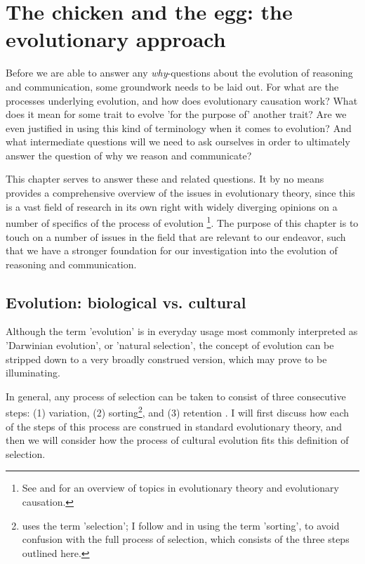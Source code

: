 \chapter{The chicken and the egg: the evolutionary approach}
\label{ch:evolution}

Before we are able to answer any \emph{why}-questions about the evolution of reasoning and communication, some groundwork needs to be laid out. For what are the processes underlying evolution, and how does evolutionary causation work? What does it mean for some trait to evolve 'for the purpose of' another trait? Are we even justified in using this kind of terminology when it comes to evolution? And what intermediate questions will we need to ask ourselves in order to ultimately answer the question of why we reason and communicate?

This chapter serves to answer these and related questions. It by no means provides a comprehensive overview of the issues in evolutionary theory, since this is a vast field of research in its own right with widely diverging opinions on a number of specifics of the process of evolution \footnote{See \citet{Ariew02} and \citet{UllerLaland19} for an overview of topics in evolutionary theory and evolutionary causation.}.
The purpose of this chapter is to touch on a number of issues in the field that are relevant to our endeavor, such that we have a stronger foundation for our investigation into the evolution of reasoning and communication.

\section{Evolution: biological vs. cultural}
\label{sec:evo-bio-culture}


Although the term 'evolution' is in everyday usage most commonly interpreted as 'Darwinian evolution', or 'natural selection', the concept of evolution can be stripped down to a very broadly construed version, which may prove to be illuminating.

In general, any process of selection can be taken to consist of three consecutive steps: (1) variation, (2) sorting\footnote{\citet{Donahoe03} uses the term 'selection'; I follow \citet{Heyes18} and \citet{S-P13} in using the term 'sorting', to avoid confusion with the full process of selection, which consists of the three steps outlined here.}, and (3) retention \citep{Donahoe03}. I will first discuss how each of the steps of this process are construed in standard evolutionary theory, and then we will consider how the process of cultural evolution fits this definition of selection.

